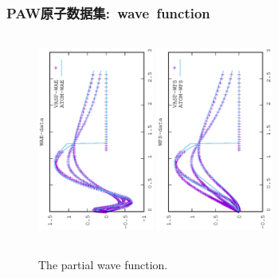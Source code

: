 \frame
{
	\frametitle{\textrm{PAW}原子数据集:~\textrm{wave~function}}
\begin{figure}[h!]
\centering
\vskip -0.5in
\includegraphics[width=1.5in,height=2.7in,viewport=0 0 350 550, angle=-90, clip]{Figures/WAE-data.eps}
\vskip -0.2in
\includegraphics[height=2.7in,width=1.5in,viewport=0 0 350 550, angle=-90, clip]{Figures/WPS-data.eps}
\caption{\tiny \textrm{The partial wave function.}}%
\label{Wave_Function}
\end{figure}
}

